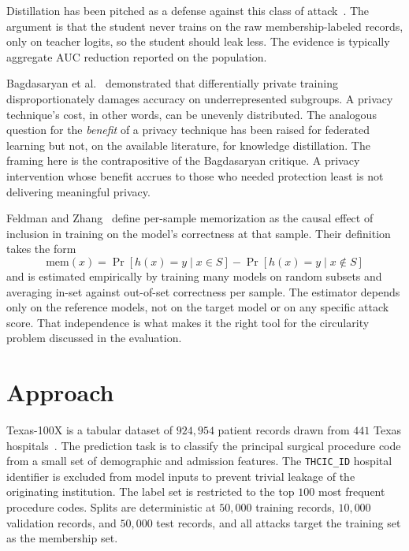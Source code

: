 \documentclass[conference]{IEEEtran}
\begin{document}
Distillation has been pitched as a defense against this class of attack~\cite{shejwalkar2021, tang2022}. The argument is that the student never trains on the raw membership-labeled records, only on teacher logits, so the student should leak less. The evidence is typically aggregate AUC reduction reported on the population.

Bagdasaryan et al.~\cite{bagdasaryan2019} demonstrated that differentially private training disproportionately damages accuracy on underrepresented subgroups. A privacy technique's cost, in other words, can be unevenly distributed. The analogous question for the \emph{benefit} of a privacy technique has been raised for federated learning but not, on the available literature, for knowledge distillation. The framing here is the contrapositive of the Bagdasaryan critique. A privacy intervention whose benefit accrues to those who needed protection least is not delivering meaningful privacy.

Feldman and Zhang~\cite{feldman2020} define per-sample memorization as the causal effect of inclusion in training on the model's correctness at that sample. Their definition takes the form
\begin{equation*}
  \mathrm{mem}(x) = \Pr[h(x) = y \mid x \in S] - \Pr[h(x) = y \mid x \notin S]
\end{equation*}
and is estimated empirically by training many models on random subsets and averaging in-set against out-of-set correctness per sample. The estimator depends only on the reference models, not on the target model or on any specific attack score. That independence is what makes it the right tool for the circularity problem discussed in the evaluation.

\section*{Approach}

Texas-100X is a tabular dataset of $924{,}954$ patient records drawn from $441$ Texas hospitals~\cite{texas100x}. The prediction task is to classify the principal surgical procedure code from a small set of demographic and admission features. The \texttt{THCIC\_ID} hospital identifier is excluded from model inputs to prevent trivial leakage of the originating institution. The label set is restricted to the top $100$ most frequent procedure codes. Splits are deterministic at $50{,}000$ training records, $10{,}000$ validation records, and $50{,}000$ test records, and all attacks target the training set as the membership set.
\end{document}
